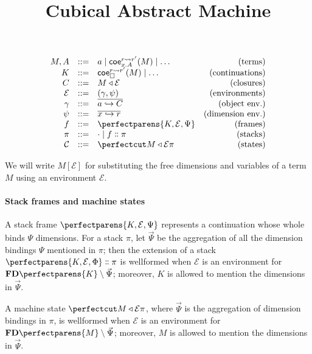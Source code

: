 \documentclass{article}
\title{Cubical Abstract Machine}
\newcommand\Clo[2]{#1\triangleleft{#2}}
\newcommand\Coe[4]{\mathsf{coe}^{#1\leadsto{#2}}_{#3} (#4)}
\newcommand\Cons[2]{{#1}\dblcolon{#2}}
\newcommand\FreeDims[1]{\mathbf{FD}\perfectparens{#1}}
\newcommand\Frame[3]{\perfectparens{#1,#2,#3}}
\newcommand\Cfg[3]{\cut{\Clo{#1}{#2}}{#3}}
\begin{document}
\maketitle

\[
  \begin{array}{rrlr}
    M,A &::= &a\mid \Coe{r}{r'}{x.A}{M}\mid\ldots&\text{(terms)}\\
    K &::= &\Coe{r}{r'}{\Box}{M}\mid\ldots&\text{(continuations)}\\
    C &::= &\Clo{M}{\mathcal{E}}&\text{(closures)}\\
    \mathcal{E} &::= &(\gamma,\psi)&\text{(environments)}\\
    \gamma &::= &\overline{a\hookrightarrow C}&\text{(object env.)}\\
    \psi &::= &\overline{x\hookrightarrow r}&\text{(dimension env.)}\\
    f &::= &\Frame{K}{\mathcal{E}}{\Psi} &\text{(frames)}\\
    \pi &::= &\cdot \mid \Cons{f}{\pi} &\text{(stacks)}\\
    \mathcal{C} &::= &\Cfg{M}{\mathcal{E}}{\pi} &\text{(states)}
  \end{array}
\]

We will write $M[\mathcal{E}]$ for substituting the free dimensions
and variables of a term $M$ using an environment $\mathcal{E}$.

\paragraph{Stack frames and machine states}

A stack frame $\Frame{K}{\mathcal{E}}{\Psi}$ represents a continuation
whose whole binds $\Psi$ dimensions. For a stack $\pi$, let
$\vec{\Psi}$ be the aggregation of all the dimension bindings $\Psi$
mentioned in $\pi$; then the extension of a stack
$\Cons{\Frame{K}{\mathcal{E}}{\Phi}}{\pi}$ is wellformed when
$\mathcal{E}$ is an environment for $\FreeDims{K}\setminus\vec{\Psi}$;
moreover, $K$ is allowed to mention the dimensions in $\vec{\Psi}$.

A machine state $\Cfg{M}{\mathcal{E}}{\pi}$, where $\vec{\Psi}$ is the
aggregation of dimension bindings in $\pi$, is wellformed when
$\mathcal{E}$ is an environment for $\FreeDims{M}\setminus\vec{\Psi}$;
moreover, $M$ is allowed to mention the dimensions in $\vec{\Psi}$.
\end{document}
